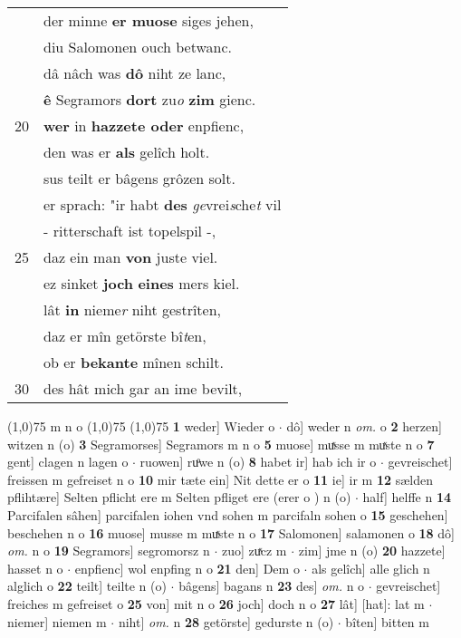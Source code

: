 \documentclass[8pt,a4paper,notitlepage]{article}
\begin{document}
\begin{table}[ht]
\begin{minipage}[t]{0.5\linewidth}
\begin{tabular}{rl}
 & der minne \textbf{er muose} siges jehen,\\ 
 & diu Salomonen ouch betwanc.\\ 
 & dâ nâch was \textbf{dô} niht ze lanc,\\ 
 & \textbf{ê} Segramors \textbf{dort} zu\textit{o} \textbf{z}\textbf{im} gienc.\\ 
20 & \textbf{wer} in \textbf{hazzete oder} enpfienc,\\ 
 & den was er \textbf{als} gelîch holt.\\ 
 & sus teilt er bâgens grôzen solt.\\ 
 & er sprach: "ir habt \textbf{des} \textit{ge}vrei\textit{s}che\textit{t} vil\\ 
 & - ritterschaft ist topelspil -,\\ 
25 & daz ein man \textbf{von} juste viel.\\ 
 & ez sinket \textbf{joch} \textbf{eines} mers kiel.\\ 
 & lât \textbf{in} nieme\textit{r} niht gestrîten,\\ 
 & daz er mîn getörste bî\textit{t}en,\\ 
 & ob er \textbf{bekante} mînen schilt.\\ 
30 & des hât mich gar an ime bevilt,\\ 
\end{tabular}
\scriptsize
\line(1,0){75} \newline
m n o \newline
\line(1,0){75} \newline
\newline
\line(1,0){75} \newline
\textbf{1} weder] Wieder o  $\cdot$ dô] weder n \textit{om.} o \textbf{2} herzen] witzen n (o) \textbf{3} Segramorses] Segramors m n o \textbf{5} muose] muͯsse m muͯste n o \textbf{7} gent] clagen n lagen o  $\cdot$ ruowen] ruͦwe n (o) \textbf{8} habet ir] hab ich ir o  $\cdot$ gevreischet] freissen m gefreiset n o \textbf{10} mir tæte ein] Nit dette er o \textbf{11} ie] ir m \textbf{12} sælden pflihtære] Selten pflicht ere m Selten pfliget ere (erer o ) n (o)  $\cdot$ half] helffe n \textbf{14} Parcifalen sâhen] parcifalen iohen vnd sohen m parcifaln sohen o \textbf{15} geschehen] beschehen n o \textbf{16} muose] musse m muͯste n o \textbf{17} Salomonen] salamonen o \textbf{18} dô] \textit{om.} n o \textbf{19} Segramors] segromorsz n  $\cdot$ zuo] zuͯcz m  $\cdot$ zim] jme n (o) \textbf{20} hazzete] hasset n o  $\cdot$ enpfienc] wol enpfing n o \textbf{21} den] Dem o  $\cdot$ als gelîch] alle glich n alglich o \textbf{22} teilt] teilte n (o)  $\cdot$ bâgens] bagans n \textbf{23} des] \textit{om.} n o  $\cdot$ gevreischet] freiches m gefreiset o \textbf{25} von] mit n o \textbf{26} joch] doch n o \textbf{27} lât] [hat]: lat m  $\cdot$ niemer] niemen m  $\cdot$ niht] \textit{om.} n \textbf{28} getörste] gedurste n (o)  $\cdot$ bîten] bitten m \newline
\end{minipage}
\end{table}
\end{document}

